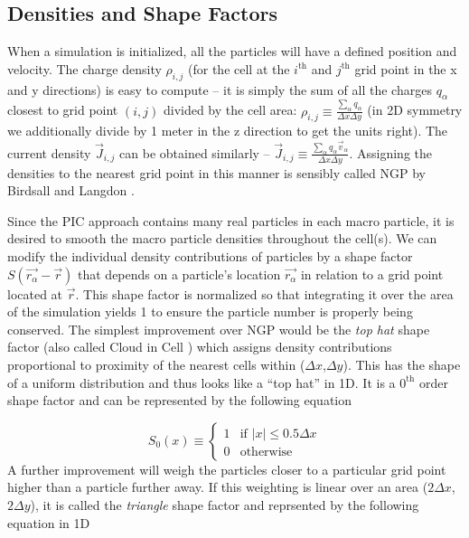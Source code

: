 \subsection{Densities and Shape Factors}

When a simulation is initialized, all the particles will have a defined position and velocity. The charge density $\rho_{i,j}$ (for the cell at the $i^\text{th}$ and $j^\text{th}$ grid point in the x and y directions) is easy to compute -- it is simply the sum of all the charges $q_\alpha$ closest to grid point $(i,j)$ divided by the cell area: $\rho_{i,j} \equiv \frac{\sum_\alpha q_\alpha}{\Delta x \Delta y}$ (in 2D symmetry we additionally divide by 1 meter in the z direction to get the units right). The current density $\vec{J}_{i,j}$ can be obtained similarly -- $\vec{J}_{i,j} \equiv \frac{\sum_\alpha q_\alpha \vec{v}_\alpha}{\Delta x \Delta y}$. Assigning the densities to the nearest grid point in this manner is sensibly called \gls{NGP} by Birdsall and Langdon \cite{Birdsall_2004_PIC}.

Since the PIC approach contains many real particles in each macro particle, it is desired to smooth the macro particle densities throughout the cell(s). We can modify the individual density contributions of particles by a shape factor $S(\vec{r_\alpha} - \vec{r})$ that depends on a particle's location $\vec{r_\alpha}$ in relation to a grid point located at $\vec{r}$. This shape factor is normalized so that integrating it over the area of the simulation yields 1 to ensure the particle number is properly being conserved. The simplest improvement over \gls{NGP} would be the \emph{top hat} shape factor (also called Cloud in Cell \cite{Birdsall_2004_PIC}) which assigns density contributions proportional to proximity of the nearest cells within ($\Delta x$,$\Delta y$). This has the shape of a uniform distribution and thus looks like a ``top hat'' in 1D. It is a $0^\text{th}$ order shape factor and can be represented by the following equation

\begin{equation}
	S_0(x) \equiv \begin{cases}
		1 & \text{if } \lvert x \rvert \leq 0.5 \Delta x \\
		0 & \text{otherwise}
	\end{cases} \label{eq:tophat}
\end{equation}
A further improvement will weigh the particles closer to a particular grid point higher than a particle further away. If this weighting is linear over an area ($2 \Delta x$, $2 \Delta y$), it is called the \emph{triangle} shape factor and reprsented by the following equation in 1D

